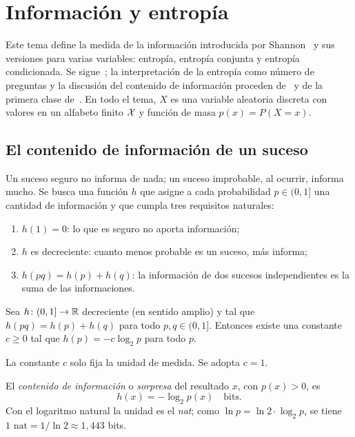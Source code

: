 \chapter{Información y entropía}
\label{tema:1}

Este tema define la medida de la información introducida por Shannon~\cite{shannon} y sus versiones para varias variables: entropía, entropía conjunta y entropía condicionada. Se sigue~\cite[§2.1, §2.2 y §2.5]{ct}; la interpretación de la entropía como número de preguntas y la discusión del contenido de información proceden de~\cite[cap.~2 y~4]{mackay} y de la primera clase de~\cite{camit}. En todo el tema, $X$ es una variable aleatoria discreta con valores en un alfabeto finito $\mathcal{X}$ y función de masa $p(x)=P(X=x)$.

\section{El contenido de información de un suceso}

Un suceso seguro no informa de nada; un suceso improbable, al ocurrir, informa mucho. Se busca una función $h$ que asigne a cada probabilidad $p\in(0,1]$ una cantidad de información y que cumpla tres requisitos naturales:
\begin{enumerate}
  \item $h(1)=0$: lo que es seguro no aporta información;
  \item $h$ es decreciente: cuanto menos probable es un suceso, más informa;
  \item $h(pq)=h(p)+h(q)$: la información de dos sucesos independientes es la suma de las informaciones.
\end{enumerate}

\begin{proposicion}\label{prop:caracterizacion}
Sea $h\colon(0,1]\to\mathbb{R}$ decreciente (en sentido amplio) y tal que $h(pq)=h(p)+h(q)$ para todo $p,q\in(0,1]$. Entonces existe una constante $c\ge 0$ tal que $h(p)=-c\log_2 p$ para todo $p$.
\end{proposicion}

La constante $c$ solo fija la unidad de medida. Se adopta $c=1$.

\begin{definicion}\label{def:sorpresa}
El \emph{contenido de información} o \emph{sorpresa} del resultado $x$, con $p(x)>0$, es
\[
h(x)=-\log_2 p(x)\quad\text{bits}.
\]
Con el logaritmo natural la unidad es el \emph{nat}; como $\ln p=\ln 2\cdot\log_2 p$, se tiene $1\text{ nat}=1/\ln 2\approx 1{,}443$ bits.
\end{definicion}

